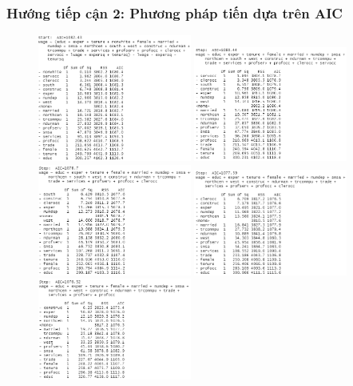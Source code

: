 \subsubsection*{Hướng tiếp cận 2: Phương pháp tiến dựa trên AIC}
\begin{figure}[H]
	\includegraphics[width=0.45\textwidth]{../Photo Of Result/stepAIC(4)-1}
	\includegraphics[width=0.45\textwidth]{../Photo Of Result/stepAIC(4)-2}
	\includegraphics[width=0.45\textwidth]{../Photo Of Result/stepAIC(4)-3}
	\includegraphics[width=0.45\textwidth]{../Photo Of Result/stepAIC(4)-4}
	\includegraphics[width=0.45\textwidth]{../Photo Of Result/stepAIC(4)-5}

\end{figure}

